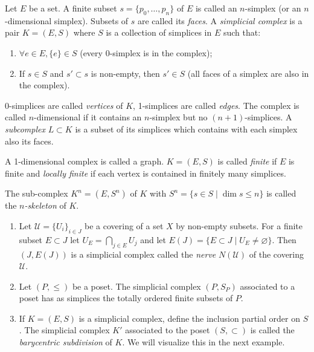 \documentclass[english,letterpaper]{article}%
\numberwithin{equation}{section}
\numberwithin{figure}{section}
\numberwithin{table}{section}
\theoremstyle{definition}
\theoremstyle{definition}
\theoremstyle{definition}
\theoremstyle{plain}
\theoremstyle{plain}
\theoremstyle{plain}
\theoremstyle{plain}
\theoremstyle{remark}
\theoremstyle{remark}
\newcommand{\calU}{\mathcal{U}}
\renewcommand{\leq}{\leqslant}
\begin{document}
\begin{defn}
    Let $E$ be a set. A finite subset $s=\{ p_0,\ldots,p_n\}$ of $E$ is called an $n$-simplex (or an $n$-dimensional simplex). Subsets of $s$ are called its \emph{faces}. A \emph{simplicial complex} is a pair $K=(E,S)$ where $S$ is a collection of simplices in $E$ such that:
    \begin{enumerate}
        \item $\forall e\in E, \{e\}\in S$ (every 0-simplex is in the complex);
        \item If $s\in S$ and $s'\subset s$ is non-empty, then $s'\in S$ (all faces of a simplex are also in the complex).
    \end{enumerate}
    0-simplices are called \emph{vertices} of $K$, 1-simplices are called \emph{edges}. The complex is called $n$-dimensional if it contains an $n$-simplex but no $(n+1)$-simplices. A \emph{subcomplex} $L\subset K$ is a subset of its simplices which contains with each simplex also its faces.
    
    A 1-dimensional complex is called a graph. $K=(E,S)$ is called \emph{finite} if $E$ is finite and \emph{locally finite} if each vertex is contained in finitely many simplices.
    
    The sub-complex $K^n=(E,S^n)$ of $K$ with $S^n=\{s\in S\mid \dim s\leq n\}$ is called the \emph{$n$-skeleton} of $K$.
\end{defn}

\begin{example}
    \begin{enumerate}
        \item Let $\calU=\{U_i\}_{i\in J}$ be a covering of a set $X$ by non-empty subsets. For a finite subset $E\subset J$ let $U_E=\bigcap_{j\in E}U_j$ and let $E(J)=\{E\subset J\mid U_E\neq\varnothing\}$. Then $(J,E(J))$ is a simplicial complex called the \emph{nerve} $N(\calU)$ of the covering $\calU$.
        \item Let $(P,\leq)$ be a poset. The simplicial complex $(P,S_P)$ associated to a poset has as simplices the totally ordered finite subsets of $P$.
        \item If $K=(E,S)$ is a simplicial complex, define the inclusion partial order on $S$. The simplicial complex $K'$ associated to the poset $(S,\subset)$ is called the \emph{barycentric subdivision} of $K$. We will visualize this in the next example.
    \end{enumerate}
\end{example}
\end{document}

